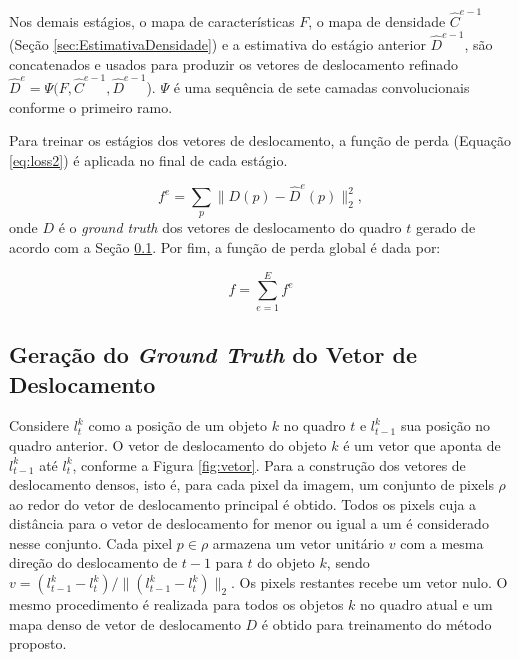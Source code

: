 Nos demais estágios, o mapa de características $F$, o mapa de densidade $\hat{C}^{e-1}$ (Seção \ref{sec:EstimativaDensidade}) e a estimativa do estágio anterior $\hat{D}^{e-1}$, são concatenados e usados para produzir os vetores de deslocamento refinado $\hat{D}^{e} = \Psi(F,\hat{C}^{e-1}, \hat{D}^{e-1}$). 
$\Psi$ é uma sequência de sete camadas convolucionais conforme o primeiro ramo.

Para treinar os estágios dos vetores de deslocamento, a função de perda (Equação \ref{eq:loss2}) é aplicada no final de cada estágio.

\begin{equation}
f^{e} = \sum_p \parallel D(p) - \hat{D}^{e}(p)\parallel^2_2,
\label{eq:loss2}
\end{equation}
onde $D$ é o \textit{ground truth} dos vetores de deslocamento do quadro $t$ gerado de acordo com a Seção \ref{sec:geracao_mapa2}. Por fim, a função de perda global é dada por:

\begin{equation}
f = \sum_{e=1}^{E} f^{e}
\end{equation}

\subsection{Geração do \textit{Ground Truth} do Vetor de Deslocamento}
\label{sec:geracao_mapa2}


Considere $l_t^k$ como a posição de um objeto $k$ no quadro $t$ e $l_{t-1}^k$ sua posição no quadro anterior.
O vetor de deslocamento do objeto $k$ é um vetor que aponta de $l^k_{t-1}$ até $l^k_{t}$, conforme a Figura \ref{fig:vetor}.
Para a construção dos vetores de deslocamento densos, isto é, para cada pixel da imagem, um conjunto de pixels $\rho$ ao redor do vetor de deslocamento principal é obtido.
Todos os pixels cuja a distância para o vetor de deslocamento for menor ou igual a um é considerado nesse conjunto.
Cada pixel $p \in \rho$ armazena um vetor unitário $v$ com a mesma direção do deslocamento de $t-1$ para $t$ do objeto $k$, sendo $v = (l^k_{t-1} - l^k_{t})/\|(l^k_{t-1} - l^k_{t})\|_2$.
Os pixels restantes recebe um vetor nulo. 
O mesmo procedimento é realizada para todos os objetos $k$ no quadro atual e um mapa denso de vetor de deslocamento $D$ é obtido para treinamento do método proposto.

